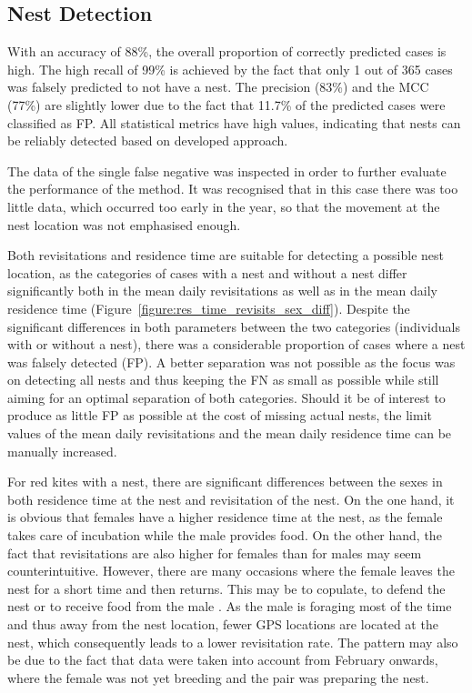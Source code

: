 \subsection{Nest Detection}
With an accuracy of 88\%, the overall proportion of correctly predicted cases is high. The high recall of 99\% is achieved by the fact that only 1 out of 365 cases was falsely predicted to not have a nest. The precision (83\%) and the MCC (77\%) are slightly lower due to the fact that 11.7\% of the predicted cases were classified as FP. All statistical metrics have high values, indicating that nests can be reliably detected based on developed approach.

The data of the single false negative was inspected in order to further evaluate the performance
of the method. It was recognised that in this case there was too little data, which occurred too early in the year, so that the movement at the nest location was not emphasised enough. 

Both revisitations and residence time are suitable for detecting a possible nest location, as the categories of cases with a nest and without a nest differ significantly both in the mean daily revisitations as well as in the mean daily residence time (Figure~\ref{figure:res_time_revisits_sex_diff}). Despite the significant differences in both parameters between the two categories (individuals with or without a nest), there was a considerable proportion of cases where a nest was falsely detected (FP). A better separation was not possible as the focus was on detecting all nests and thus keeping the FN as small as possible while still aiming for an optimal separation of both categories. Should it be of interest to produce as little FP as possible at the cost of missing actual nests, the limit values of the mean daily revisitations and the mean daily residence time can be manually increased.

For red kites with a nest, there are significant differences between the sexes in both residence time at the nest and revisitation of the nest. On the one hand, it is obvious that females have a higher residence time at the nest, as the female takes care of incubation while the male provides food. On the other hand, the fact that revisitations are also higher for females than for males may seem counterintuitive. However, there are many occasions where the female leaves the nest for a short time and then returns. This may be to copulate, to defend the nest or to receive food from the male \parencite{aebischer2021rotmilan}. As the male is foraging most of the time and thus away from the nest location, fewer GPS locations are located at the nest, which consequently leads to a lower revisitation rate. The pattern may also be due to the fact that data were taken into account from February onwards, where the female was not yet breeding and the pair was preparing the nest.


